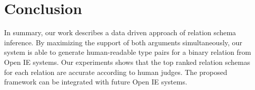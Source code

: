 \section{Conclusion}

In summary, our work describes a data driven approach of
relation schema inference.
By maximizing the support of both arguments simultaneously,
our system is able to generate human-readable type pairs for 
a binary relation from Open IE systems. 
Our experiments shows that the top ranked relation schemas for 
each relation are accurate according to human judges.
The proposed framework can be integrated with future Open IE systems.
